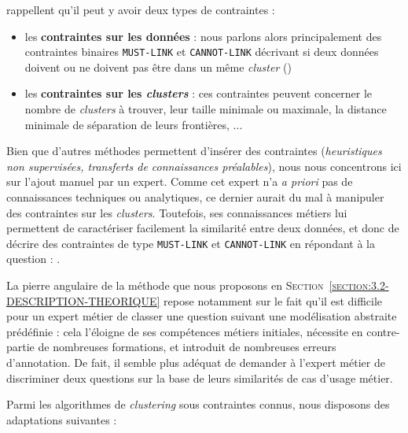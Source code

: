 		\cite{lampert-etal:2018:constrained-distance-based} rappellent qu'il peut y avoir deux types de contraintes :
		\begin{itemize}
			\item les \textbf{contraintes sur les données} : nous parlons alors principalement des contraintes binaires \texttt{MUST-LINK} et \texttt{CANNOT-LINK} décrivant si deux données doivent ou ne doivent pas être dans un même \textit{cluster} (\cite{wagstaff-cardie:2000:clustering-instancelevel-constraints})
			\item les \textbf{contraintes sur les \textit{clusters}} : ces contraintes peuvent concerner le nombre de \textit{clusters} à trouver, leur taille minimale ou maximale, la distance minimale de séparation de leurs frontières, ...
		\end{itemize}
		
		Bien que d'autres méthodes permettent d'insérer des contraintes (\textit{heuristiques non supervisées, transferts de connaissances préalables}), nous nous concentrons ici sur l'ajout manuel par un expert.
		Comme cet expert n'a \textit{a priori} pas de connaissances techniques ou analytiques, ce dernier aurait du mal à manipuler des contraintes sur les \textit{clusters}.
		Toutefois, ses connaissances métiers lui permettent de caractériser facilement la similarité entre deux données, et donc de décrire des contraintes de type \texttt{MUST-LINK} et \texttt{CANNOT-LINK} en répondant à la question : .
		
		\begin{leftBarAuthorOpinion}
			La pierre angulaire de la méthode que nous proposons en \textsc{Section~\ref{section:3.2-DESCRIPTION-THEORIQUE}} repose notamment sur le fait qu'il est difficile pour un expert métier de classer une question suivant une modélisation abstraite prédéfinie : cela l'éloigne de ses compétences métiers initiales, nécessite en contre-partie de nombreuses formations, et introduit de nombreuses erreurs d'annotation.
			De fait, il semble plus adéquat de demander à l'expert métier de discriminer deux questions sur la base de leurs similarités de cas d'usage métier.
		\end{leftBarAuthorOpinion}
		
		
		Parmi les algorithmes de \textit{clustering} sous contraintes connus, nous disposons des adaptations suivantes :
		
